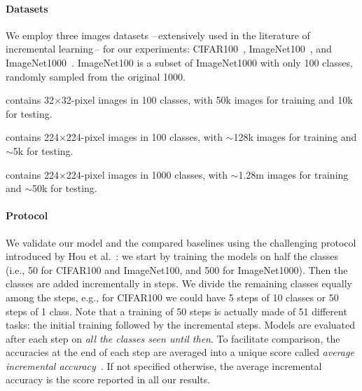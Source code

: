 \paragraph{Datasets} We employ three images datasets --\,extensively used in the literature of
incremental learning\,-- for our experiments: CIFAR100~\citep{krizhevskycifar100},
ImageNet100~\citep{deng2009imagenet,hou2019ucir,wu2019bias_correction}, and
ImageNet1000~\citep{deng2009imagenet}. ImageNet100 is a subset of ImageNet1000 with only 100
classes, randomly sampled from the original 1000.

{\begin{description} \setlength{\parskip}{0pt}
    \item[CIFAR100] contains 32$\times$32-pixel images in 100 classes, with 50k images for training
          and 10k for testing.
    \item[ImageNet100] contains 224$\times$224-pixel images in 100 classes, with $\sim$128k images
          for training and $\sim$5k for testing.
    \item[ImageNet1000] contains 224$\times$224-pixel images in 1000 classes, with $\sim$1.28m
          images for training and $\sim$50k for testing. \end{description}}

\paragraph{Protocol} We validate our model and the compared baselines using the challenging protocol
introduced by Hou et al.~\citep{hou2019ucir}: we start by training the models on half the classes
(i.e., 50 for CIFAR100 and ImageNet100, and 500 for ImageNet1000). Then the classes are added
incrementally in steps. We divide the remaining classes equally among the steps, e.g., for CIFAR100
we could have 5 steps of 10 classes or 50 steps of 1 class. Note that a training of 50 steps is
actually made of 51 different tasks: the initial training followed by the incremental steps. Models
are evaluated after each step on \textit{all the classes seen until then}. To facilitate comparison,
the accuracies at the end of each step are averaged into a unique score called \textit{average
    incremental accuracy}~\citep{rebuffi2017icarl}. If not specified otherwise, the average incremental
accuracy is the score reported in all our results.


